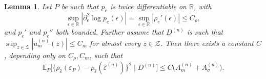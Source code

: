 \documentclass[aos]{imsart}
\newcommand{\R}{\mathbb{R}}
\newcommand{\E}{\mathbb{E}}
\newtheorem{lemma}[theorem]{Lemma}
\begin{document}
	
	\begin{lemma}
		\label{lem:estimatedresidual_locationonly}
		Let $P$ be such that $p_{e}$ is twice differentiable on $\R$, with \begin{equation*}
			\sup_{\epsilon\in\R} |\partial_\epsilon^2 \log p_{e}(\epsilon)| = \sup_{\epsilon\in\R} |\rho_{e}'(\epsilon)|\leq C_\rho,
		\end{equation*}
		and $p_{e}'$ and $ p_{e}''$ both bounded. Further assume that $D^{(n)}$ is such that $\sup_{z\in\mathcal{Z}} |u_m^{(n)}(z)|\leq C_m$ for almost every $z\in\mathcal{Z}$. 
		Then there exists a constant $C$, depending only on $C_\rho, C_m$, such that
		\begin{equation*}
			\E_P\Big[\big\{\rho_{\hat\varepsilon}(\varepsilon_P)-\rho_{\hat\varepsilon}(\hat\varepsilon^{(n)})\big\}^2 \; \Big| \; D^{(n)}\Big] \leq C \big(A_m^{(n)} + A_\sigma^{(n)}\big).
		\end{equation*}
	\end{lemma}
\end{document}
